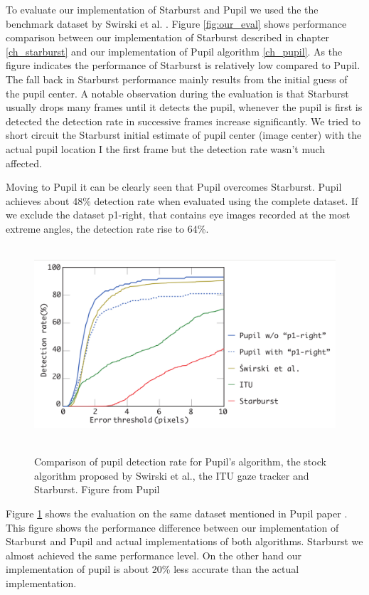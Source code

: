 To evaluate our implementation of Starburst and Pupil we used the the benchmark dataset by Swirski et al. \cite{swirski}. Figure \ref{fig:our_eval} shows performance comparison between our implementation of Starburst described in chapter \ref{ch_starburst} and our implementation of Pupil algorithm \ref{ch_pupil}. As the figure indicates the performance of Starburst is relatively low compared to Pupil. The fall back in Starburst performance mainly results from the initial guess of the pupil center. A notable observation during the evaluation is that Starburst usually drops many frames until it detects the pupil, whenever the pupil is first is detected the detection rate in successive frames increase significantly. We tried to short circuit the Starburst initial estimate of pupil center (image center) with the actual pupil location I the first frame but the detection rate wasn't much affected. \bigskip

Moving to Pupil it can be clearly seen that Pupil overcomes Starburst. Pupil achieves about 48\% detection rate when evaluated using the complete dataset. If we exclude the dataset p1-right, that contains eye images recorded at the most extreme angles, the detection rate rise to 64\%. \bigskip

\begin{figure}[!h]
\begin{dBox}
\centering
	\mbox{
		\includegraphics[width=\textwidth]{./Pictures/evaluation/comparison_pupil.png}
	}
   \caption{Comparison of pupil detection rate for Pupil’s algorithm, the stock algorithm proposed by Swirski et al., the ITU gaze tracker and Starburst. Figure from Pupil \cite{starburst} \label{fig:pupil_eval} }   
\end{dBox}   
\end{figure}

Figure \ref{fig:pupil_eval} shows the evaluation on the same dataset mentioned in Pupil paper \cite{pupil} . This figure shows the performance difference between our implementation of Starburst and Pupil and actual implementations of both algorithms. Starburst we almost achieved the same performance level. On the other hand our implementation of pupil is about 20\% less accurate than the actual implementation.




